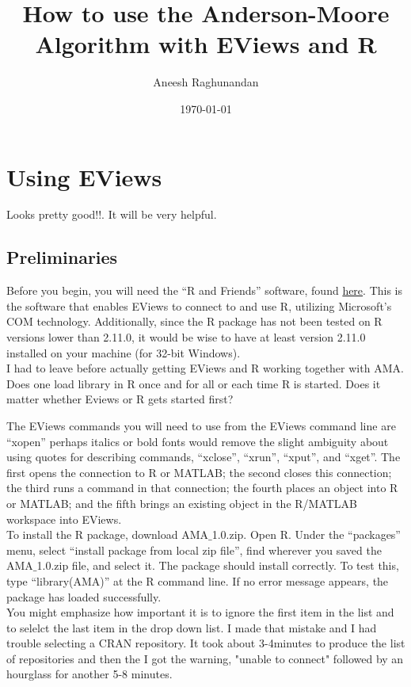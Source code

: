 \documentclass[11pt]{article}
\title{How to use the Anderson-Moore Algorithm with EViews and R}
\author{Aneesh Raghunandan}
\date{\today}
\newcommand{\gc}[1]{{\color{blue} #1}}
\begin{document}
\maketitle
\section{Using EViews} \gc{Looks pretty good!!.  It will be very helpful.}
\subsection{Preliminaries} 
Before you begin, you will need the ``R and Friends'' software, found \href{http://rcom.univie.ac.at/download.html}{here}.  This is the software that enables EViews to connect to and use R, utilizing Microsoft's COM technology.  Additionally, since the R package has not been tested on R versions lower than 2.11.0, it would be wise to have at least version 2.11.0 installed on your machine (for 32-bit Windows). \\ \gc{ I had to leave before actually getting EViews and R working together with AMA.  Does one load library in R once and for all or each time R is started.  Does it matter whether Eviews or R gets started first?}
 
The EViews commands you will need to use from the EViews command line are ``xopen''\gc{perhaps italics or bold fonts would  remove the slight ambiguity about using quotes for describing commands}, ``xclose'', ``xrun'', ``xput'', and ``xget''.  The first opens the connection to R or MATLAB; the second closes this connection; the third runs a command in that connection; the fourth places an object into R or MATLAB; and the fifth brings an existing object in the R/MATLAB workspace into EViews. \\

To install the R package, download AMA$\_$1.0.zip.  Open R.  Under the ``packages'' menu, select ``install package from local zip file'', find wherever you saved the AMA$\_$1.0.zip file, and select it.  The package should install correctly.  To test this, type ``library(AMA)'' at the R command line.  If no error message appears, the package has loaded successfully. \\ \gc{{ You might emphasize how important it is to ignore the first item in the list and to selelct the last item in the drop down list.  I made that mistake and I had trouble selecting a CRAN repository. It took about 3-4minutes to produce the list of repositories and then the I got the warning, "unable to connect" followed by an hourglass for another 5-8 minutes.}}
\end{document}
